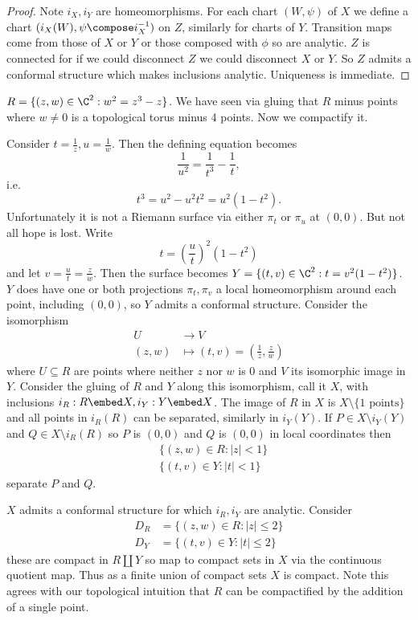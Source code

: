 \documentclass[a4paper]{article}
\begin{document}
\begin{proof}
  Note \(i_X, i_Y\) are homeomorphisms. For each chart \((W, \psi)\) of \(X\) we define a chart \((i_X(W), \psi \compose i_X^{-1})\) on \(Z\), similarly for charts of \(Y\). Transition maps come from those of \(X\) or \(Y\) or those composed with \(\phi\) so are analytic. \(Z\) is connected for if we could disconnect \(Z\) we could disconnect \(X\) or \(Y\). So \(Z\) admits a conformal structure which makes inclusions analytic. Uniqueness is immediate.
\end{proof}

\begin{eg}
  \(R = \{(z, w) \in \C^2: w^2 = z^3 - z\}\). We have seen via gluing that \(R\) minus points where \(w \neq 0\) is a topological torus minus 4 points. Now we compactify it.

  Consider \(t =  \frac{1}{z}, u = \frac{1}{w}\). Then the defining equation becomes
  \[
    \frac{1}{u^2} = \frac{1}{t^3} - \frac{1}{t},
  \]
  i.e.
  \[
    t^3 = u^2 - u^2t^2 = u^2 (1 - t^2).
  \]
  Unfortunately it is not a Riemann surface via either \(\pi_t\) or \(\pi_u\) at \((0, 0)\). But not all hope is lost. Write
  \[
    t = \left(\frac{u}{t} \right)^2 (1 - t^2)
  \]
  and let \(v = \frac{u}{t} = \frac{z}{w}\). Then the surface becomes \(Y = \{(t, v) \in \C^2: t = v^2 (1 - t^2)\}\). \(Y\) does have one or both projections \(\pi_t, \pi_v\) a local homeomorphism around each point, including \((0, 0)\), so \(Y\) admits a conformal structure. Consider the isomorphism
  \begin{align*}
    U &\to V \\
    (z, w) &\mapsto (t, v) = (\frac{1}{z}, \frac{z}{w})
  \end{align*}
  where \(U \subseteq R\) are points where neither \(z\) nor \(w\) is \(0\) and \(V\) its isomorphic image in \(Y\). Consider the gluing of \(R\) and \(Y\) along this isomorphism, call it \(X\), with inclusions \(i_R: R \embed X, i_Y: Y \embed X\). The image of \(R\) in \(X\) is \(X \setminus \{1 \text{ points}\}\) %
  and all points in \(i_R(R)\) can be separated, similarly in \(i_Y(Y)\). If \(P \in X \setminus i_Y(Y)\) and \(Q \in X \setminus i_R(R)\) so \(P\) is \((0, 0)\) and \(Q\) is \((0, 0)\) in local coordinates then
  \begin{align*}
    &\{(z, w) \in R: |z| < 1\} \\
    &\{(t, v) \in Y: |t| < 1\}
  \end{align*}
  separate \(P\) and \(Q\).

  \(X\) admits a conformal structure for which \(i_R, i_Y\) are analytic. Consider
  \begin{align*}
    D_R &= \{(z, w) \in R: |z| \leq 2\} \\
    D_Y &= \{(t, v) \in Y: |t| \leq 2\}
  \end{align*}
  these are compact in \(R \amalg Y\) so map to compact sets in \(X\) via the continuous quotient map. Thus as a finite union of compact sets \(X\) is compact. Note this agrees with our topological intuition that \(R\) can be compactified by the addition of a single point.
\end{eg}
\end{document}
